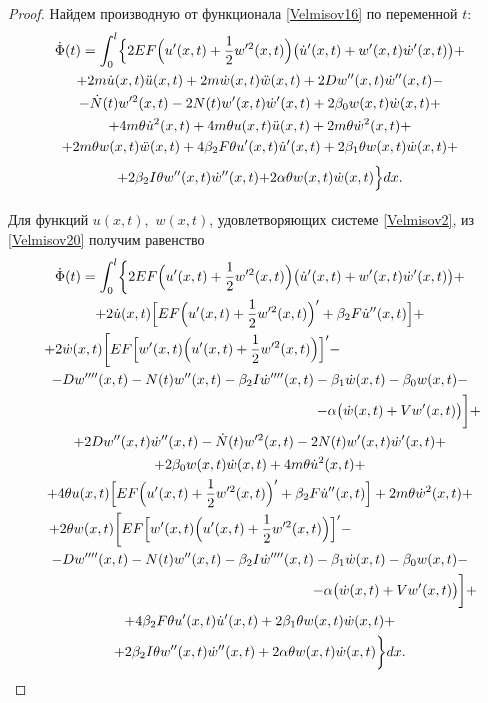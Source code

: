\begin{proof}
Найдем производную от функционала \eqref{Velmisov16} по переменной $t$:
\begin{multline}
\label{Velmisov20} 
\dot{\Phi }(t)=\int_{0}^{l}
\Bigl\{ 
2EF \Bigl(u'(x,t)+\frac{1}{2} w'^{2} (x,t)\Bigr)\bigl(\dot{u}'(x,t)+w'(x,t)\dot{w}'(x,t)\bigr)+
\\
+2m\dot{u}(x,t)\ddot{u}(x,t)+2m\dot{w}(x,t)\ddot{w}(x,t)+2Dw''(x,t)\dot{w}''(x,t)- \\
- \dot{N}(t)w'^{2} (x,t)-
2N(t)w'(x,t)\dot{w}'(x,t)+2\beta _{0} w(x,t)\dot{w}(x,t)+ \\ 
+4m\theta \dot{u}^{2} (x,t)+4m\theta u(x,t)\ddot{u}(x,t)+ 2m\theta \dot{w}^{2} (x,t) +
\\ 
+2m\theta w(x,t)\ddot{w}(x,t)+4\beta _{2}F  \theta u'(x,t)\dot{u}'(x,t) +2\beta _{1} \theta w(x,t)\dot{w}(x,t) +
\\ +2\beta _{2} I\theta w''(x,t)\dot{w}''(x,t)\biggl. +2\alpha \theta w(x,t)\dot{w}(x,t)\Bigr\}dx.
\end{multline}

Для функций $u(x,t),$ $w(x,t)$, удовлетворяющих системе \eqref{Velmisov2}, из \eqref{Velmisov20} получим равенство
\begin{multline}
\label{Velmisov21} 
\dot{\Phi }(t)=
\int _{0}^{l} 
\biggl\{2EF \Bigl(u'(x,t)+\frac{1}{2} w'^{2} (x,t)\Bigr)
\bigl(\dot{u}'(x,t)+w'(x,t)\dot{w}'(x,t)\bigr)+ 
\\
+2\dot{u}(x,t)\Bigl[EF\Bigl(u'(x,t)+\frac{1}{2} w'^{2} (x,t)\Bigr)' +\beta _{2}F  \dot{u}''(x,t)\Bigr]+
\\
+2\dot{w}(x,t)\biggl[EF
\Bigl[w'(x,t)\Bigl(u'(x,t)+\frac{1}{2} w'^{2} (x,t)\Bigr)\Bigr]' - \hspace{3.4cm} \\  
-Dw''''(x,t)  - N(t)w''(x,t) - \beta _{2}I \dot{w}''''(x,t) - \beta _{1} \dot{w}(x,t) - \beta _{0} w(x,t)- \\ 
\hspace{7cm} - \alpha \bigl(\dot{w}(x,t)+Vw'(x,t)\bigr)\biggr]+
\\
+2Dw''(x,t)\dot{w}''(x,t)- \dot{N}(t)w'^{2} (x,t) - 2N(t)w'(x,t)\dot{w}'(x,t) + \\ 
+ 2\beta _{0} w(x,t)\dot{w}(x,t)+ 4m\theta \dot{u}^{2} (x,t) +  \\
+ 4\theta u(x,t)
\Bigl[EF\Bigl(u'(x,t)+ \frac{1}{2} w'^{2} (x,t)\Bigr)'  + \beta _{2}F \dot{u}''(x,t)\Bigr]  +2m\theta \dot{w}^{2} (x,t)+
\\
+2\theta w(x,t)\biggl[EF
\Bigl[w'(x,t)\Bigl(u'(x,t)+\frac{1}{2} w'^{2} (x,t)\Bigr)\Bigr]'  - \hspace{3cm} \\ 
-Dw''''(x,t)-  N(t)w''(x,t) - \beta _{2}I \dot{w}''''(x,t) - \beta _{1} \dot{w}(x,t) - \beta _{0} w(x,t) -
\\ 
\hspace{6.8cm}
- \alpha \bigl(\dot{w}(x,t)+Vw'(x,t)\bigr)\biggr]+
\\
+4\beta _{2}F \theta u'(x,t)\dot{u}'(x,t)+2\beta _{1} \theta w(x,t)\dot{w}(x,t)+ \\ 
+2\beta _{2} I\theta w''(x,t)\dot{w}''(x,t)+ 2\alpha \theta w(x,t)\dot{w}(x,t)\biggr\}dx. 
\end{multline}
 

\end{proof}
